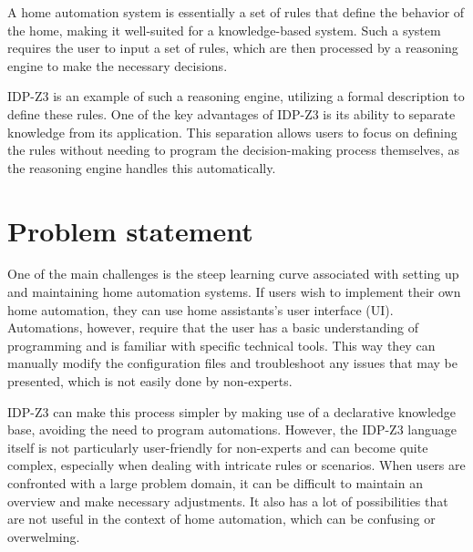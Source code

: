 \documentclass[11pt,a4paper]{report}
\begin{document}
A home automation system is essentially a set of rules that define the behavior of the home, making it well-suited for a knowledge-based system. Such a system requires the user to input a set of rules, which are then processed by a reasoning engine to make the necessary decisions.

IDP-Z3 is an example of such a reasoning engine, utilizing a formal description to define these rules. One of the key advantages of IDP-Z3 is its ability to separate knowledge from its application. This separation allows users to focus on defining the rules without needing to program the decision-making process themselves, as the reasoning engine handles this automatically.

\section{Problem statement}
One of the main challenges is the steep learning curve associated with setting up and maintaining home automation systems. If users wish to implement their own home automation, they can use home assistants's user interface (UI). Automations, however, require that the user has a basic understanding of programming and is familiar with specific technical tools. This way they can manually modify the configuration files and troubleshoot any issues that may be presented, which is not easily done by non-experts.

IDP-Z3 can make this process simpler by making use of a declarative knowledge base, avoiding the need to program automations. However, the IDP-Z3 language itself is not particularly user-friendly for non-experts and can become quite complex, especially when dealing with intricate rules or scenarios. When users are confronted with a large problem domain, it can be difficult to maintain an overview and make necessary adjustments. It also has a lot of possibilities that are not useful in the context of home automation, which can be confusing or overwelming.
\end{document}
